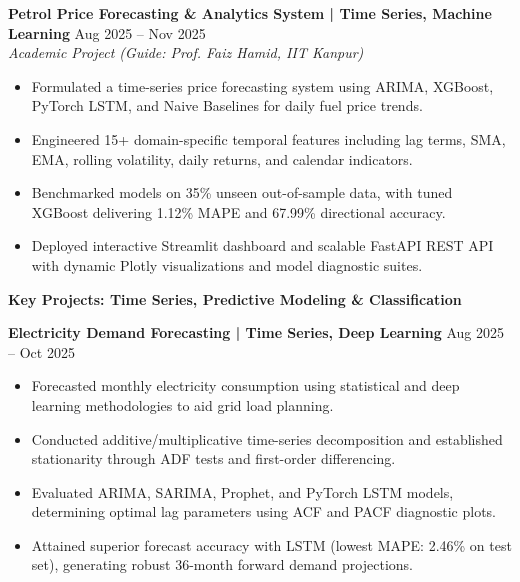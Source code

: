 \documentclass[10pt]{article}
\begin{document}
\textbf{Petrol Price Forecasting \& Analytics System | Time Series, Machine Learning} \hfill Aug 2025 -- Nov 2025\\
\textit{Academic Project (Guide: Prof. Faiz Hamid, IIT Kanpur)}
\begin{itemize}[noitemsep, topsep=2pt, partopsep=0pt, parsep=1.5pt]
    \item Formulated a time-series price forecasting system using ARIMA, XGBoost, PyTorch LSTM, and Naive Baselines for daily fuel price trends.
    \item Engineered 15+ domain-specific temporal features including lag terms, SMA, EMA, rolling volatility, daily returns, and calendar indicators.
    \item Benchmarked models on 35\% unseen out-of-sample data, with tuned XGBoost delivering 1.12\% MAPE and 67.99\% directional accuracy.
    \item Deployed interactive Streamlit dashboard and scalable FastAPI REST API with dynamic Plotly visualizations and model diagnostic suites.
\end{itemize}

\newpage

\begin{center}
    \textbf{Key Projects: Time Series, Predictive Modeling \& Classification}
\end{center}
\vspace{-4pt}

\textbf{Electricity Demand Forecasting | Time Series, Deep Learning} \hfill Aug 2025 -- Oct 2025
\begin{itemize}[noitemsep, topsep=2pt, partopsep=0pt, parsep=1.5pt]
    \item Forecasted monthly electricity consumption using statistical and deep learning methodologies to aid grid load planning.
    \item Conducted additive/multiplicative time-series decomposition and established stationarity through ADF tests and first-order differencing.
    \item Evaluated ARIMA, SARIMA, Prophet, and PyTorch LSTM models, determining optimal lag parameters using ACF and PACF diagnostic plots.
    \item Attained superior forecast accuracy with LSTM (lowest MAPE: 2.46\% on test set), generating robust 36-month forward demand projections.
\end{itemize}
\end{document}
